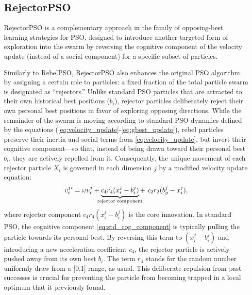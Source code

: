 {\subsection{RejectorPSO}

RejectorPSO is a complementary approach in the family of opposing-best learning strategies for PSO, designed to introduce another targeted form of exploration into the swarm by reversing the cognitive component of the velocity update (instead of a social component) for a specific subset of particles. 

Similarly to RebelPSO, RejectorPSO also enhances the original PSO algorithm by assigning a certain role to particles:
a fixed fraction of the total particle swarm is designated as ``rejectors.'' Unlike standard PSO particles that are attracted to their own historical best positions ($b_i$), rejector particles deliberately reject their own personal best positions in favor of exploring opposing directions.
While the remainder of the swarm is moving according to standard PSO dynamics defined by the equations (\ref{eq:velocity_update}-\ref{eq:gbest_update}), rebel particles
preserve their inertia and social terms from \eqref{eq:velocity_update}, but invert their cognitive component---so that, instead of being drawn toward their personal best $b_i$, they are actively repelled from it.
Consequently, the unique movement of each rejector particle $X_i$ is governed in each dimension $j$ by a modified velocity update equation:
\begin{equation}\label{eq:velocity_update_rejector}
v_{i}^{j}{}'= \omega v_{i}^{j} + 
\underbrace{c_4 r_4 (x_{i}^{j} - b_{i}^{j})}_{\mathclap{\text{rejector component}}} +\ 
c_2 r_2 (b_{g}^{j} - x_{i}^{j}),
\end{equation}
where rejector component $c_4 r_4 (x_{i}^{j} - b_{i}^{j})$ is the core innovation. In standard PSO, the cognitive component \eqref{eq:std_cog_component} is typically pulling the particle towards its personal best. By reversing this term to $(x_{i}^{j} - b_{i}^{j})$ and introducing a new acceleration coefficient $c_4$, the rejector particle is actively pushed away from its own best $b_i$. The term $r_4$ stands for the random number uniformly draw from a [0,1] range, as usual. This deliberate repulsion from past successes is crucial for preventing the particle from becoming trapped in a local optimum that it previously found.

\begin{figure}[H]
    \centering
\end{figure}}
